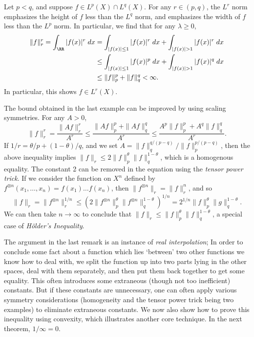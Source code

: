 \begin{example}
  Let $p < q$, and suppose $f \in L^p(X) \cap L^q(X)$. For any $r \in (p,q)$, the $L^r$ norm emphasizes the height of $f$ less than the $L^q$ norm, and emphasizes the width of $f$ less than the $L^p$ norm. In particular, we find that for any $\lambda \geq 0$,
  \begin{align*}
    \| f \|_r^r = \int_{\RR} |f(x)|^r\; dx &= \int_{|f(x)| \leq 1} |f(x)|^r\; dx + \int_{|f(x)| > 1} |f(x)|^r\; dx\\
    &\leq \int_{|f(x)| \leq 1} |f(x)|^p\; dx + \int_{|f(x)| > 1} |f(x)|^q\; dx\\
    &\leq \| f \|_p^p + \| f \|_q^q < \infty.
  \end{align*}
  In particular, this shows $f \in L^r(X)$.
\end{example}

\begin{remark}
    The bound obtained in the last example can be improved by using scaling symmetries. For any $A > 0$,
    \[ \| f \|_r^r = \frac{\| Af \|_r^r}{A^r} \leq \frac{\| Af \|_p^p + \| Af \|_q^q}{A^r} \leq \frac{A^p \| f \|_p^p + A^q \| f \|_q^q}{A^r}. \]
    If $1/r = \theta/p + (1 - \theta)/q$, and we set $A = \| f \|_q^{q/(p-q)} / \| f \|_p^{p/(p-q)}$, then the above inequality implies $\| f \|_r \leq 2 \| f \|_p^\theta \| f \|_q^{1 - \theta}$, which is a homogenous equality. The constant 2 can be removed in the equation using the {\it tensor power trick}. If we consider the function on $X^n$ defined by $f^{\otimes n}(x_1, \dots, x_n) = f(x_1) \dots f(x_n)$, then $\| f^{\otimes n} \|_r = \| f \|_r^n$, and so
    \[ \| f \|_r = \| f^{\otimes n} \|_r^{1/n} \leq \left( 2 \| f^{\otimes n} \|_p^\theta \| f^{\otimes n} \|_q^{1-\theta} \right)^{1/n} = 2^{1/n} \| f \|_p^\theta \| g \|_q^{1-\theta}. \]
    We can then take $n \to \infty$ to conclude that $\| f \|_r \leq \| f \|_p^\theta \| f \|_q^{1-\theta}$, a special case of \emph{H\"{o}lder's Inequality}.
\end{remark}

The argument in the last remark is an instance of \emph{real interpolation}; In order to conclude some fact about a function which lies `between' two other functions we know how to deal with, we split the function up into two parts lying in the other spaces, deal with them separately, and then put them back together to get some equality. This often introduces some extraneous (though not too inefficient) constants. But if these constants are unnecessary, one can often apply various symmetry considerations (homogeneity and the tensor power trick being two examples) to eliminate extraneous constants. We now also show how to prove this inequality using convexity, which illustrates another core technique. In the next theorem, $1/\infty = 0$.

